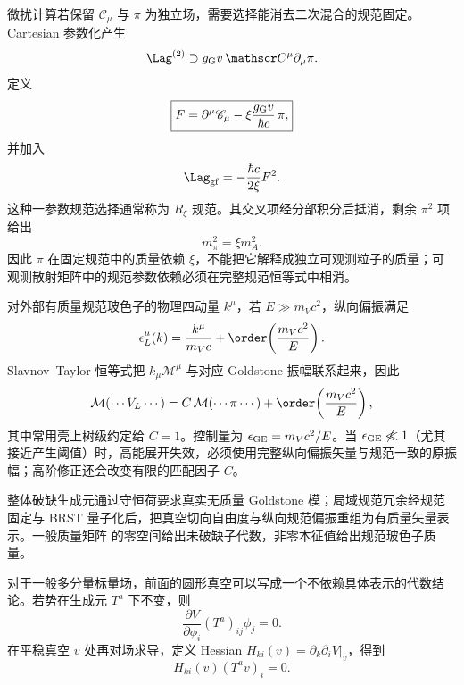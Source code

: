微扰计算若保留 $\mathscr C_\mu$ 与 $\pi$ 为独立场，需要选择能消去二次混合的规范固定。Cartesian 参数化产生
\begin{equation}
 \Lag^{(2)}\supset g_{\rm G}v\,\mathscr C^\mu\partial_\mu\pi.
 \label{eq:gauge-goldstone-mixing-dp11}
\end{equation}
定义
\begin{equation}
 \boxed{
 F=\partial^\mu\mathscr C_\mu
 -\xi\frac{g_{\rm G}v}{\hbar c}\,\pi,}
 \label{eq:rxi-gauge-functional-abelian-dp42}
\end{equation}
并加入
\begin{equation}
 \Lag_{\rm gf}
 =-\frac{\hbar c}{2\xi}F^2.
 \label{eq:rxi-abelian-gf-dp11}
\end{equation}
这种一参数规范选择通常称为 $R_\xi$ 规范。其交叉项经分部积分后抵消，剩余 $\pi^2$ 项给出
\begin{equation}
 \boxed{m_\pi^2=\xi m_A^2.}
 \label{eq:rxi-goldstone-mass-abelian-dp42}
\end{equation}
因此 $\pi$ 在固定规范中的质量依赖 $\xi$，不能把它解释成独立可观测粒子的质量；可观测散射矩阵中的规范参数依赖必须在完整规范恒等式中相消。

对外部有质量规范玻色子的物理四动量 \(k^\mu\)，若 \(E\gg m_Vc^2\)，纵向偏振满足
\begin{equation*}
 \epsilon_L^\mu(k)
 =\frac{k^\mu}{m_Vc}
 +\order\!\left(\frac{m_Vc^2}{E}\right).
\end{equation*}
Slavnov--Taylor 恒等式把 \(k_\mu\mathcal M^\mu\) 与对应 Goldstone 振幅联系起来，因此
\begin{equation}
 \mathcal M(\cdots V_L\cdots)
 =C\,\mathcal M(\cdots\pi\cdots)
 +\order\!\left(\frac{m_Vc^2}{E}\right),
 \label{eq:goldstone-equivalence-general-dp11}
\end{equation}
其中常用壳上树级约定给 \(C=1\)。控制量为 \(\epsilon_{\rm GE}=m_Vc^2/E\)。当 \(\epsilon_{\rm GE}\not\ll1\)（尤其接近产生阈值）时，高能展开失效，必须使用完整纵向偏振矢量与规范一致的原振幅；高阶修正还会改变有限的匹配因子 \(C\)。

整体破缺生成元通过守恒荷要求真实无质量 Goldstone 模；局域规范冗余经规范固定与 BRST 量子化后，把真空切向自由度与纵向规范偏振重组为有质量矢量表示。一般质量矩阵 的零空间给出未破缺子代数，非零本征值给出规范玻色子质量。

对于一般多分量标量场，前面的圆形真空可以写成一个不依赖具体表示的代数结论。若势在生成元 \(T^a\) 下不变，则
\begin{equation}
\boxed{
\frac{\partial V}{\partial\phi_i}(T^a)_{ij}\phi_j=0.}
\label{eq:ssb-general-potential-invariance-dp68}
\end{equation}
在平稳真空 \(v\) 处再对场求导，定义 Hessian \(H_{ki}(v)=\partial_k\partial_iV|_v\)，得到
\begin{equation}
\boxed{
H_{ki}(v)(T^av)_i=0.}
\label{eq:ssb-general-hessian-zero-mode-dp68}
\end{equation}

